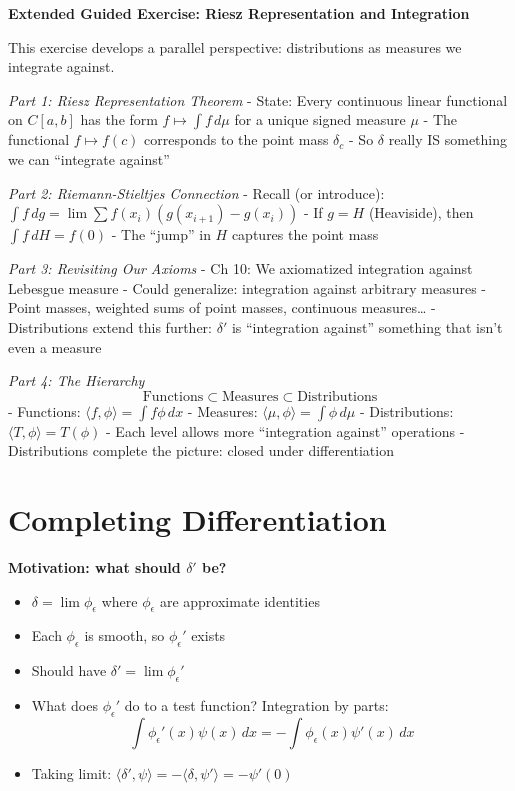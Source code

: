 \documentclass[
  10pt,
  letterpaper,
]{scrbook}
\providecommand{\tightlist}{%
  \setlength{\itemsep}{0pt}\setlength{\parskip}{0pt}}
\begin{document}
\textbf{Extended Guided Exercise: Riesz Representation and Integration}

This exercise develops a parallel perspective: distributions as measures
we integrate against.

\emph{Part 1: Riesz Representation Theorem} - State: Every continuous
linear functional on \(C[a,b]\) has the form \(f \mapsto \int f\, d\mu\)
for a unique signed measure \(\mu\) - The functional \(f \mapsto f(c)\)
corresponds to the point mass \(\delta_c\) - So \(\delta\) really IS
something we can ``integrate against''

\emph{Part 2: Riemann-Stieltjes Connection} - Recall (or introduce):
\(\int f\, dg = \lim \sum f(x_i)(g(x_{i+1}) - g(x_i))\) - If \(g = H\)
(Heaviside), then \(\int f\, dH = f(0)\) - The ``jump'' in \(H\)
captures the point mass

\emph{Part 3: Revisiting Our Axioms} - Ch 10: We axiomatized integration
against Lebesgue measure - Could generalize: integration against
arbitrary measures - Point masses, weighted sums of point masses,
continuous measures\ldots{} - Distributions extend this further:
\(\delta'\) is ``integration against'' something that isn't even a
measure

\emph{Part 4: The Hierarchy}
\[\text{Functions} \subset \text{Measures} \subset \text{Distributions}\]
- Functions: \(\langle f, \phi \rangle = \int f\phi\, dx\) - Measures:
\(\langle \mu, \phi \rangle = \int \phi\, d\mu\) - Distributions:
\(\langle T, \phi \rangle = T(\phi)\) - Each level allows more
``integration against'' operations - Distributions complete the picture:
closed under differentiation

\section{Completing Differentiation}\label{completing-differentiation}

\textbf{Motivation: what should \(\delta'\) be?}

\begin{itemize}
\tightlist
\item
  \(\delta = \lim \phi_\epsilon\) where \(\phi_\epsilon\) are
  approximate identities
\item
  Each \(\phi_\epsilon\) is smooth, so \(\phi_\epsilon'\) exists
\item
  Should have \(\delta' = \lim \phi_\epsilon'\)
\item
  What does \(\phi_\epsilon'\) do to a test function? Integration by
  parts:
  \[\int \phi_\epsilon'(x) \psi(x)\, dx = -\int \phi_\epsilon(x) \psi'(x)\, dx\]
\item
  Taking limit:
  \(\langle \delta', \psi \rangle = -\langle \delta, \psi' \rangle = -\psi'(0)\)
\end{itemize}
\end{document}
